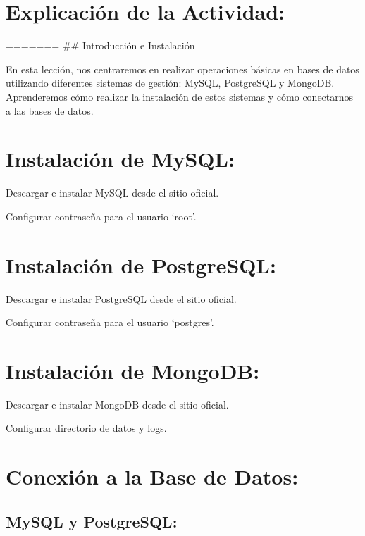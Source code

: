 \documentclass[
  a4paper,
  DIV=11,
  numbers=noendperiod,
  onepage,
  openany]{scrreprt}
\begin{document}
\hypertarget{explicaciuxf3n-de-la-actividad-70}{%
\section{Explicación de la
Actividad:}\label{explicaciuxf3n-de-la-actividad-70}}

======= \#\# Introducción e Instalación

En esta lección, nos centraremos en realizar operaciones básicas en
bases de datos utilizando diferentes sistemas de gestión: MySQL,
PostgreSQL y MongoDB. Aprenderemos cómo realizar la instalación de estos
sistemas y cómo conectarnos a las bases de datos.

\hypertarget{instalaciuxf3n-de-mysql-1}{%
\section{Instalación de MySQL:}\label{instalaciuxf3n-de-mysql-1}}

Descargar e instalar MySQL desde el sitio oficial.

Configurar contraseña para el usuario `root'.

\hypertarget{instalaciuxf3n-de-postgresql-3}{%
\section{Instalación de
PostgreSQL:}\label{instalaciuxf3n-de-postgresql-3}}

Descargar e instalar PostgreSQL desde el sitio oficial.

Configurar contraseña para el usuario `postgres'.

\hypertarget{instalaciuxf3n-de-mongodb-3}{%
\section{Instalación de MongoDB:}\label{instalaciuxf3n-de-mongodb-3}}

Descargar e instalar MongoDB desde el sitio oficial.

Configurar directorio de datos y logs.

\hypertarget{conexiuxf3n-a-la-base-de-datos-1}{%
\section{Conexión a la Base de
Datos:}\label{conexiuxf3n-a-la-base-de-datos-1}}

\hypertarget{mysql-y-postgresql-1}{%
\subsection{MySQL y PostgreSQL:}\label{mysql-y-postgresql-1}}
\end{document}
